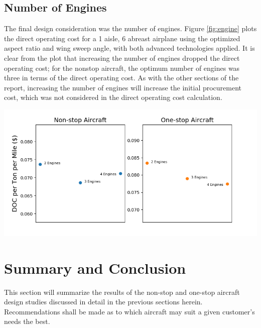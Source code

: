 \documentclass{article}
\begin{document}
    \subsection{Number of Engines}
    \label{sec:engine}
        \begin{flushleft}
            The final design consideration was the number of engines. Figure
            \ref{fig:engine} plots the direct operating cost for a 1 aisle, 6
            abreast airplane using the optimized aspect ratio and wing sweep
            angle, with both advanced technologies applied. It is clear from the
            plot that increasing the number of engines dropped the direct
            operating cost; for the nonstop aircraft, the optimum number of
            engines was three in terms of the direct operating cost. As with the
            other sections of the report, increasing the number of engines will
            increase the initial procurement cost, which was not considered in
            the direct operating cost calculation.
        \end{flushleft}

        \begin{center}
            \includegraphics[scale=0.7]{engines.PNG}
            \label{fig:engine}%
        \end{center}


    \section{Summary and Conclusion}
    \label{sec:conclusion}
        \begin{flushleft}
            This section will summarize the results of the non-stop and one-stop
            aircraft design studies discussed in detail in the previous sections
            herein. Recommendations shall be made as to which aircraft may suit a
            given customer's needs the best.
        \end{flushleft}
\end{document}

